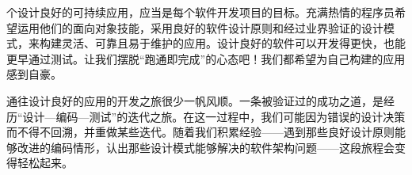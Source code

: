 个设计良好的可持续应用，应当是每个软件开发项目的目标。充满热情的程序员希望运用他们的面向对象技能，采用良好的软件设计原则和经过业界验证的设计模式，来构建灵活、可靠且易于维护的应用。设计良好的软件可以开发得更快，也能更早通过测试。让我们摆脱“跑通即完成”的心态吧！我们都希望为自己构建的应用感到自豪。

通往设计良好的应用的开发之旅很少一帆风顺。一条被验证过的成功之道，是经历“设计—编码—测试”的迭代之旅。在这一过程中，我们可能因为错误的设计决策而不得不回溯，并重做某些迭代。随着我们积累经验——遇到那些良好设计原则能够改进的编码情形，认出那些设计模式能够解决的软件架构问题——这段旅程会变得轻松起来。
